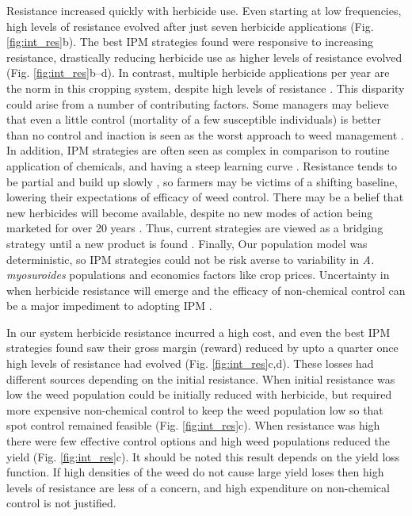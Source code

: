 \documentclass[9pt,twocolumn,twoside,lineno]{pnas-new}
\begin{document}
Resistance increased quickly with herbicide use. Even starting at low frequencies, high levels of resistance evolved after just seven herbicide applications (Fig. \ref{fig:int_res}b). The best IPM strategies found were responsive to increasing resistance, drastically reducing herbicide use as higher levels of resistance evolved (Fig. \ref{fig:int_res}b--d). In contrast, multiple herbicide applications per year are the norm in this cropping system, despite high levels of resistance \citep{Hick2018}. This disparity could arise from a number of contributing factors. Some managers may believe that even a little control (mortality of a few susceptible individuals) is better than no control and inaction is seen as the worst approach to weed management \citep{Wils2008}. In addition, IPM strategies are often seen as complex in comparison to routine application of chemicals, and having a steep learning curve \citep{Llew2006}. Resistance tends to be partial and build up slowly \citep{Moss2009, Hull2014}, so farmers may be victims of a shifting baseline, lowering their expectations of efficacy of weed control. There may be a belief that new herbicides will become available, despite no new modes of action being marketed for over 20 years \citep{Duke2012}. Thus, current strategies are viewed as a bridging strategy until a new product is found \citep{Hurl2016}. Finally, Our population model was deterministic, so IPM strategies could not be risk averse to variability in \textit{A. myosuroides} populations and economics factors like crop prices. Uncertainty in when herbicide resistance will emerge and the efficacy of non-chemical control can be a major impediment to adopting IPM \citep{Hurl2016}.     

In our system herbicide resistance incurred a high cost, and even the best IPM strategies found saw their gross margin (reward) reduced by upto a quarter once high levels of resistance had evolved (Fig. \ref{fig:int_res}c,d). These losses had different sources depending on the initial resistance. When initial resistance was low the weed population could be initially reduced with herbicide, but required more expensive non-chemical control to keep the weed population low so that spot control remained feasible (Fig. \ref{fig:int_res}c). When resistance was high there were few effective control options and high weed populations reduced the yield (Fig. \ref{fig:int_res}c). It should be noted this result depends on the yield loss function. If high densities of the weed do not cause large yield loses then high levels of resistance are less of a concern, and high expenditure on non-chemical control is not justified.           
\end{document}

